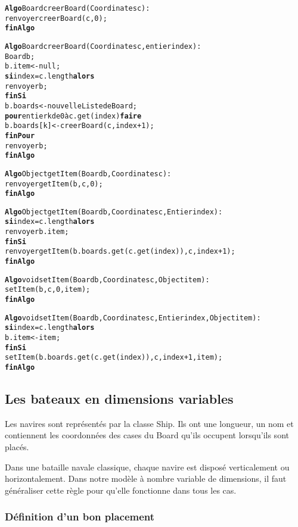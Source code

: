	\begin{alltt}
{\bf Algo} Board creerBoard(Coordinates c) :
    renvoyer creerBoard(c, 0);
{\bf finAlgo}
		
{\bf Algo} Board creerBoard(Coordinates c, entier index) :
    Board b;
    b.item <- null;
    {\bf si} index = c.length {\bf alors}
        renvoyer b;
    {\bf finSi}
    b.boards <- nouvelle Liste de Board;
    {\bf pour} entier k de 0 à c.get(index) {\bf faire}
        b.boards[k] <- creerBoard(c, index + 1);
    {\bf finPour}
    renvoyer b;
{\bf finAlgo}
		
{\bf Algo} Object getItem(Board b, Coordinates c) :
    renvoyer getItem(b, c, 0);
{\bf finAlgo}
		
		
{\bf Algo} Object getItem(Board b, Coordinates c, Entier index) :
    {\bf si} index = c.length {\bf alors}
        renvoyer b.item;
    {\bf finSi}
    renvoyer getItem(b.boards.get(c.get(index)), c, index + 1);
{\bf finAlgo}
		
{\bf Algo} voidsetItem(Board b, Coordinates c, Object item) :
    setItem(b, c, 0, item);
{\bf finAlgo}
		
{\bf Algo} void setItem(Board b, Coordinates c, Entier index, Object item) :
    {\bf si} index = c.length {\bf alors}
        b.item <- item;
    {\bf finSi}
    setItem(b.boards.get(c.get(index)), c, index + 1, item);
{\bf finAlgo}
	\end{alltt}

\subsection{Les bateaux en dimensions variables}
	Les navires sont représentés par la classe Ship. Ils ont une longueur, un nom et contiennent les coordonnées des cases du Board qu'ils occupent lorsqu'ils sont placés. \newline

	Dans une bataille navale classique, chaque navire est disposé verticalement ou horizontalement. Dans notre modèle à nombre variable de dimensions, il faut généraliser cette règle pour qu'elle fonctionne dans tous les cas.

\subsubsection{Définition d'un bon placement}

